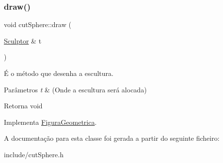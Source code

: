 \subsubsection{\texorpdfstring{draw()}{draw()}}
{\footnotesize\ttfamily void cut\+Sphere\+::draw (\begin{DoxyParamCaption}\item[{\hyperlink{class_sculptor}{Sculptor} \&}]{t }\end{DoxyParamCaption})\hspace{0.3cm}{\ttfamily [virtual]}}



É o método que desenha a escultura. 


\begin{DoxyParams}{Parâmetros}
{\em t} & (Onde a escultura será alocada) \\
\hline
\end{DoxyParams}
\begin{DoxyReturn}{Retorna}
void 
\end{DoxyReturn}


Implementa \hyperlink{class_figura_geometrica_a34585fd7c0bd7378fc69c4ee208e676c}{Figura\+Geometrica}.



A documentação para esta classe foi gerada a partir do seguinte ficheiro\+:\begin{DoxyCompactItemize}
\item 
include/cut\+Sphere.\+h\end{DoxyCompactItemize}
